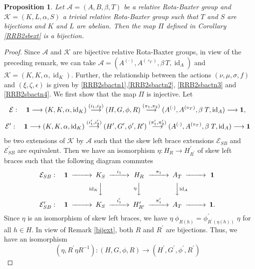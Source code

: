 \documentclass[11pt]{amsart}
\theoremstyle{thrm}
\theoremstyle{plain}
\newtheorem{prop}[thm]{Proposition}
\theoremstyle{definition}
\newcommand{\Id}{\operatorname{id}}
\numberwithin{equation}{section}
\begin{document}
\begin{prop}
Let  $\mathcal{A}=(A, B, \beta, T)$ be a  relative Rota-Baxter group and $\mathcal{K}=(K, L, \alpha, S)$ a trivial relative Rota-Baxter group such that  $T$ and $S$ are bijections and $K$ and $L$ are abelian.  Then the map  $\Pi$ defined in Corollary \ref{RRB2sbext} is a bijection.
\end{prop}

\begin{proof} 
Since $\mathcal{A}$ and $\mathcal{K}$ are bijective  relative Rota-Baxter groups, in view of the preceding remark, we can take $\mathcal{A} =(A^{(\cdot)}, A^{(\circ_T)}, \beta \, T, \Id_A)$ and $\mathcal{K} = (K, K, \alpha, \Id_K)$. Further, the relationship between the actions  $(\nu, \mu, \sigma, f)$ and $(\xi, \zeta, \epsilon)$ is given by  \eqref{RRB2sbactn1},\eqref{RRB2sbactn2}, \eqref{RRB2sbactn3} and \eqref{RRB2sbactn4}. We first show that the map $\Pi$ is injective. Let $$\mathcal{E} : \quad {\bf 1} \longrightarrow (K,K,\alpha,\Id_K) \stackrel{(i_1, i_2)}{\longrightarrow}  (H,G, \phi, R) \stackrel{(\pi_1, \pi_2)}{\longrightarrow} (A^{(\cdot)},A^{(\circ_T)}, \beta\;T, \Id_A) \longrightarrow {\bf 1},$$ 
		$$\mathcal{E}^\prime : \quad {\bf 1} \longrightarrow (K,K,\alpha,\Id_K) \stackrel{(i^\prime_1, i^\prime_2)}{\longrightarrow}  (H^\prime,G^\prime, \phi^\prime, R^\prime
		) \stackrel{(\pi^\prime_1, \pi^\prime_2)}{\longrightarrow}(A^{(\cdot)},A^{(\circ_T)}, \beta\;T, \Id_A) \longrightarrow {\bf 1}$$ be two  extensions of $\mathcal{K}$ by $\mathcal{A}$ such that  the skew left brace extensions  $\mathcal{E}_{SB}$ and  $\mathcal{E}^\prime_{SB}$ are equivalent. Then we have  an isomorphism $\eta: H_R \longrightarrow H^\prime_{R^\prime}$ of skew left braces such that the following diagram commutes
		$$\begin{CD}
			\mathcal{E}_{SB}:\quad  {\bf 1} @>>> K_S @>{i_1}>>H_R  @>{{\pi_1} }>> A_T  @>>> {\bf 1} \\
			&&  @V{\Id_{K}}VV @V{\eta}VV @VV{{\Id_{A}}}V \\
			\mathcal{E}^\prime_{SB}: \quad {\bf 1} @>>> K_S @>{i^\prime_1}>> H^\prime_{R^\prime} @>{{\pi_1^\prime} }>> A_T @>>> {\bf 1} .
		\end{CD}$$
Since $\eta$ is an isomorphism of skew left braces,  we have $\eta \; \phi_{R(h)}=\phi^\prime_{R^\prime (\eta(h))} \; \eta$ for all $h \in H$. In view of Remark \ref{bijext}, both  $R$ and $R^\prime$ are bijections. Thus, we have an isomorphism
		$$(\eta, R^\prime \eta R^{-1} ) :  (H,G, \phi, R) \longrightarrow  (H^\prime,G^\prime, \phi^\prime, R^\prime )$$

\end{proof}
\end{document}
